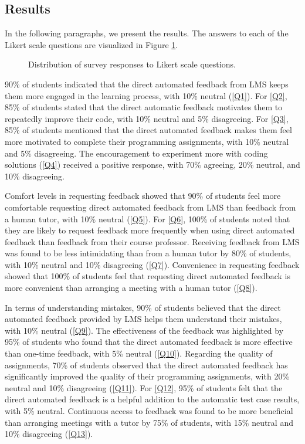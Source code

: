 \documentclass[manuscript,screen,review, anonymous]{acmart}
\begin{document}
\subsection{Results}

In the following paragraphs, we present the results. 
The answers to each of the Likert scale questions are visualized in Figure \ref{fig:Survey-Results}.

\begin{figure}[htpb]
  \centering
  \resizebox{0.8\textwidth}{!}{
    
  }
  \caption{Distribution of survey responses to Likert scale questions.}
  \label{fig:Survey-Results}
\end{figure}


90\% of students indicated that the direct automated feedback from LMS keeps them more engaged in the learning process, with 10\% neutral (\ref{Q1}).
For \ref{Q2}, 85\% of students stated that the direct automatic feedback motivates them to repeatedly improve their code, with 10\% neutral and 5\% disagreeing.
For \ref{Q3}, 85\% of students mentioned that the direct automated feedback makes them feel more motivated to complete their programming assignments, with 10\% neutral and 5\% disagreeing.
The encouragement to experiment more with coding solutions (\ref{Q4}) received a positive response, with 70\% agreeing, 20\% neutral, and 10\% disagreeing.


Comfort levels in requesting feedback showed that 90\% of students feel more comfortable requesting direct automated feedback from LMS than feedback from a human tutor, with 10\% neutral (\ref{Q5}).
For \ref{Q6}, 100\% of students noted that they are likely to request feedback more frequently when using direct automated feedback than feedback from their course professor.
Receiving feedback from LMS was found to be less intimidating than from a human tutor by 80\% of students, with 10\% neutral and 10\% disagreeing (\ref{Q7}).
Convenience in requesting feedback showed that 100\% of students feel that requesting direct automated feedback is more convenient than arranging a meeting with a human tutor (\ref{Q8}).


In terms of understanding mistakes, 90\% of students believed that the direct automated feedback provided by LMS helps them understand their mistakes, with 10\% neutral (\ref{Q9}).
The effectiveness of the feedback was highlighted by 95\% of students who found that the direct automated feedback is more effective than one-time feedback, with 5\% neutral (\ref{Q10}).
Regarding the quality of assignments, 70\% of students observed that the direct automated feedback has significantly improved the quality of their programming assignments, with 20\% neutral and 10\% disagreeing (\ref{Q11}).
For \ref{Q12}, 95\% of students felt that the direct automated feedback is a helpful addition to the automatic test case results, with 5\% neutral.
Continuous access to feedback was found to be more beneficial than arranging meetings with a tutor by 75\% of students, with 15\% neutral and 10\% disagreeing (\ref{Q13}).
\end{document}
